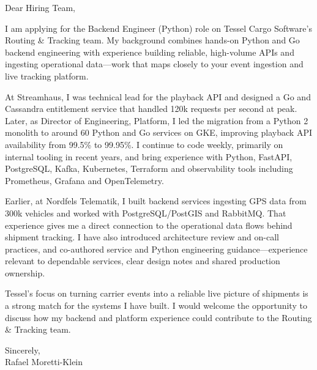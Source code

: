 \documentclass[11pt,a4paper]{article}
\begin{document}
Dear Hiring Team,

I am applying for the Backend Engineer (Python) role on Tessel Cargo Software’s Routing \& Tracking team. My background combines hands-on Python and Go backend engineering with experience building reliable, high-volume APIs and ingesting operational data—work that maps closely to your event ingestion and live tracking platform.

At Streamhaus, I was technical lead for the playback API and designed a Go and Cassandra entitlement service that handled 120k requests per second at peak. Later, as Director of Engineering, Platform, I led the migration from a Python 2 monolith to around 60 Python and Go services on GKE, improving playback API availability from 99.5\% to 99.95\%. I continue to code weekly, primarily on internal tooling in recent years, and bring experience with Python, FastAPI, PostgreSQL, Kafka, Kubernetes, Terraform and observability tools including Prometheus, Grafana and OpenTelemetry.

Earlier, at Nordfels Telematik, I built backend services ingesting GPS data from 300k vehicles and worked with PostgreSQL/PostGIS and RabbitMQ. That experience gives me a direct connection to the operational data flows behind shipment tracking. I have also introduced architecture review and on-call practices, and co-authored service and Python engineering guidance—experience relevant to dependable services, clear design notes and shared production ownership.

Tessel’s focus on turning carrier events into a reliable live picture of shipments is a strong match for the systems I have built. I would welcome the opportunity to discuss how my backend and platform experience could contribute to the Routing \& Tracking team.

Sincerely,\\
Rafael Moretti-Klein
\end{document}

